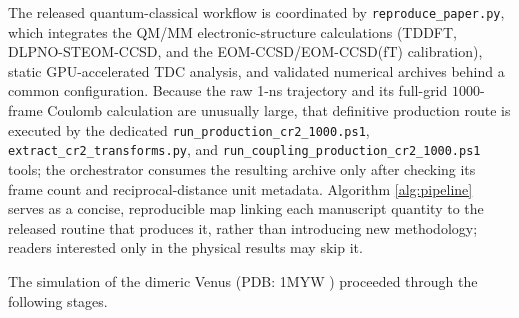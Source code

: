 \documentclass[journal=jpcbfk, manuscript=article, layout=twocolumn, doi=true]{achemso}
\begin{document}
The released quantum-classical workflow is coordinated by \texttt{reproduce\_paper.py}, which integrates the QM/MM electronic-structure calculations (TDDFT, DLPNO-STEOM-CCSD, and the EOM-CCSD/EOM-CCSD(fT) calibration), static GPU-accelerated TDC analysis, and validated numerical archives behind a common configuration. Because the raw 1-ns trajectory and its full-grid $1000$-frame Coulomb calculation are unusually large, that definitive production route is executed by the dedicated \texttt{run\_\allowbreak production\_\allowbreak cr2\_\allowbreak 1000.ps1}, \texttt{extract\_\allowbreak cr2\_\allowbreak transforms.py}, and \texttt{run\_\allowbreak coupling\_\allowbreak production\_\allowbreak cr2\_\allowbreak 1000.ps1} tools; the orchestrator consumes the resulting archive only after checking its frame count and reciprocal-distance unit metadata. Algorithm \ref{alg:pipeline} serves as a concise, reproducible map linking each manuscript quantity to the released routine that produces it, rather than introducing new methodology; readers interested only in the physical results may skip it.

The simulation of the dimeric Venus (PDB: 1MYW \cite{berman2000protein}) proceeded through the following stages.
\end{document}
